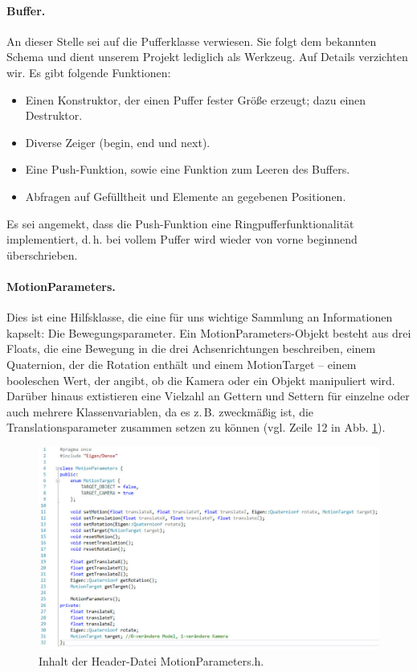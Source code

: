 	\paragraph{Buffer.} An dieser Stelle sei auf die Pufferklasse verwiesen. Sie folgt dem bekannten Schema und dient unserem Projekt lediglich als Werkzeug. Auf Details verzichten wir. Es gibt folgende Funktionen:
	\begin{itemize}
	\item Einen Konstruktor, der einen Puffer fester Größe erzeugt; dazu einen Destruktor.
	\item Diverse Zeiger (begin, end und next).
	\item Eine Push-Funktion, sowie eine Funktion zum Leeren des Buffers.
	\item Abfragen auf Gefülltheit und Elemente an gegebenen Positionen.
	\end{itemize}
	Es sei angemekt, dass die Push-Funktion eine Ringpufferfunktionalität implementiert, d.\,h. bei vollem Puffer wird wieder von vorne beginnend überschrieben.\par\medskip
	\paragraph{MotionParameters.} Dies ist eine Hilfsklasse, die eine für uns wichtige Sammlung an Informationen kapselt: Die Bewegungsparameter. Ein MotionParameters-Objekt besteht aus drei Floats, die eine Bewegung in die drei Achsenrichtungen beschreiben, einem Quaternion, der die Rotation enthält und einem \glqq MotionTarget\grqq{} -- einem booleschen Wert, der angibt, ob die Kamera oder ein Objekt manipuliert wird. Darüber hinaus extistieren eine Vielzahl an Gettern und Settern für einzelne oder auch mehrere Klassenvariablen, da es z.\,B.  zweckmäßig ist, die Translationsparameter zusammen setzen zu können (vgl. Zeile 12 in Abb. \ref{fig:motpar}).
	\begin{figure}[h]
	\centering
	\includegraphics[width=.8\textwidth]{pictures/motionparameters.jpg}
	\caption{Inhalt der Header-Datei MotionParameters.h.}\label{fig:motpar}
	\end{figure}\par\medskip
